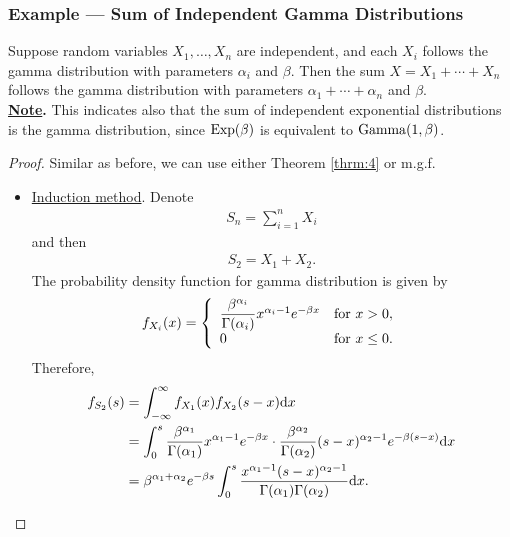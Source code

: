 \subsubsection*{Example --- Sum of Independent Gamma Distributions}

Suppose random variables $X_1, \ldots, X_n$ are independent, and each $X_i$ follows the gamma distribution with parameters $\alpha_i$ and $\beta$. Then the sum $X = X_1 + \cdots + X_n$ follows the gamma distribution with parameters $\alpha_1 + \cdots + \alpha_n$ and $\beta$. \\
\textbf{\underline{Note}.} This indicates also that the sum of independent exponential distributions is the gamma distribution, since $\mathrm{Exp}(\beta)$ is equivalent to $\mathrm{Gamma}(1, \beta)$.
\begin{proof}
	Similar as before, we can use either Theorem \ref{thrm:4} or m.g.f.
	\begin{itemize}
		\item \underline{Induction method}. Denote
		\begin{align*}
		S_n = \sum_{i=1}^n X_i
		\end{align*}
		and then
		\begin{align*}
		S_2 = X_1 + X_2.
		\end{align*}
		The probability density function for gamma distribution is given by
		\begin{align*}
		f_{X_i}(x) = \left\{
		\begin{array}{ll}
		\dfrac{\beta^{\alpha_i}}{\Gamma(\alpha_i)} x^{\alpha_i-1}e^{-\beta x} & \mathrm{for\ } x > 0, \\
		0 & \mathrm{for\ } x\leq 0.
		\end{array}
		\right.
		\end{align*}
		Therefore,
		\begin{align*}
		f_{S_2}(s) & = \int_{-\infty}^{\infty} f_{X_1}(x)f_{X_2}(s-x)\mathrm{d}x \\
		& = \int_0^{s} \dfrac{\beta^{\alpha_1}}{\Gamma(\alpha_1)} x^{\alpha_1-1}e^{-\beta x} \cdot \dfrac{\beta^{\alpha_2}}{\Gamma(\alpha_2)} (s-x)^{\alpha_2-1}e^{-\beta (s-x)} \mathrm{d}x \\
		& = \beta^{\alpha_1 + \alpha_2}e^{-\beta s} \int_0^s \frac{x^{\alpha_1 - 1}(s-x)^{\alpha_2-1}}{\Gamma(\alpha_1)\Gamma(\alpha_2)}\mathrm{d}x.
		\end{align*}
\end{itemize}
\end{proof}
